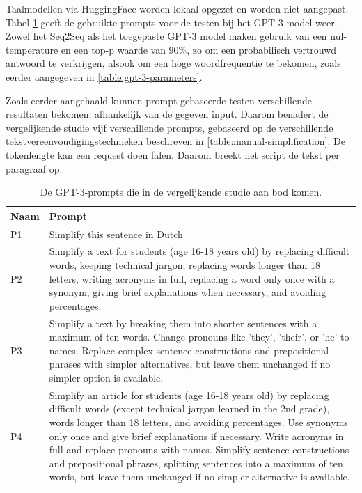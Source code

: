
\medspace

Taalmodellen via HuggingFace worden lokaal opgezet en worden niet aangepast. Tabel \ref{table:tested-prompts} geeft de gebruikte prompts voor de testen bij het GPT-3 model weer. Zowel het Seq2Seq als het toegepaste GPT-3 model maken gebruik van een nul-temperature en een top-p waarde van 90\%, zo om een probabilisch vertrouwd antwoord te verkrijgen, alsook om een hoge woordfrequentie te bekomen, zoals eerder aangegeven in \ref{table:gpt-3-parameters}.



\medspace

Zoals eerder aangehaald kunnen prompt-gebaseerde testen verschillende resultaten bekomen, afhankelijk van de gegeven input. Daarom benadert de vergelijkende studie vijf verschillende prompts, gebaseerd op de verschillende tekstvereenvoudigingstechnieken beschreven in \ref{table:manual-simplification}. De tokenlengte kan een request doen falen. Daarom breekt het script de tekst per paragraaf op.

\begin{center}
	\begin{table}[H]
		\begin{tabular}{ | m{2cm} | m{14cm} | } 
			\hline
			\textbf{Naam} & \textbf{Prompt} \\
			\hline
			P1 & Simplify this sentence in Dutch \\
			\hline
			P2 & Simplify a text for students (age 16-18 years old) by replacing difficult words, keeping technical jargon, replacing words longer than 18 letters, writing acronyms in full, replacing a word only once with a synonym, giving brief explanations when necessary, and avoiding percentages. \\
			\hline
			P3 & Simplify a text by breaking them into shorter sentences with a maximum of ten words. Change pronouns like 'they', 'their', or 'he' to names. Replace complex sentence constructions and prepositional phrases with simpler alternatives, but leave them unchanged if no simpler option is available. \\
			\hline
			P4 & Simplify an article for students (age 16-18 years old) by replacing difficult words (except technical jargon learned in the 2nd grade), words longer than 18 letters, and avoiding percentages. Use synonyms only once and give brief explanations if necessary. Write acronyms in full and replace pronouns with names. Simplify sentence constructions and prepositional phrases, splitting sentences into a maximum of ten words, but leave them unchanged if no simpler alternative is available. \\
			\hline
		\end{tabular}
		\label{table:tested-prompts}
		\caption{De GPT-3-prompts die in de vergelijkende studie aan bod komen.}
	\end{table}
\end{center}


